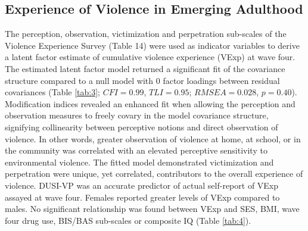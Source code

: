 \documentclass[utf8]{article}
\begin{document}
%
\vspace{20pt}
\subsection*{Experience of Violence in Emerging Adulthood} The perception, observation, victimization and perpetration sub-scales of the Violence Experience Survey (Table 14) were used as indicator variables to derive a latent factor estimate of cumulative violence experience (VExp) at wave four. The estimated latent factor model returned a significant fit of the covariance structure compared to a null model with $0$ factor loadings between residual covariances (Table \ref{tab:3}; $CFI = 0.99$, $TLI = 0.95$; $RMSEA = 0.028$, $p = 0.40$). Modification indices revealed an enhanced fit when allowing the perception and observation measures to freely covary in the model covariance structure, signifying collinearity between perceptive notions and direct observation of violence. In other words, greater observation of violence at home, at school, or in the community was correlated with an elevated perceptive sensitivity to environmental violence. The fitted model demonstrated victimization and perpetration were unique, yet correlated, contributors to the overall experience of violence. DUSI-VP was an accurate predictor of actual self-report of VExp assayed at wave four. Females reported greater levels of VExp compared to males. No significant relationship was found between VExp and SES, BMI, wave four drug use, BIS/BAS sub-scales or composite IQ (Table \ref{tab:4}).  
%
\end{document}
